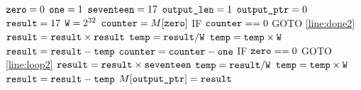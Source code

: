 \documentclass[11pt]{article}
\begin{document}
\begin{enumerate}
\begin{algorithm}[H]
\setcounter{AlgoLine}{-1}
$\texttt{zero} = 0$\;
$\texttt{one} = 1$\;
$\texttt{seventeen} = 17$\;
$\texttt{output\_len} = 1$\;
$\texttt{output\_ptr} = 0$\;
$\texttt{result} = 17$\;
$\texttt{W} = 2^{32}$\;
$\texttt{counter} = M[\texttt{zero}]$\;
\Indp
IF $\texttt{counter} == 0$ GOTO \ref{line:done2}\; \label{line:loop2}
$\texttt{result} = \texttt{result} \times \texttt{result}$\;
$\texttt{temp} = \texttt{result} / \texttt{W}$\;
$\texttt{temp} = \texttt{temp} \times \texttt{W}$\;
$\texttt{result} = \texttt{result} - \texttt{temp}$\;
$\texttt{counter} = \texttt{counter} - \texttt{one}$\;
IF $\texttt{zero} == 0$ GOTO \ref{line:loop2}\;
\Indm
$\texttt{result} = \texttt{result} \times \texttt{seventeen}$\;
\label{line:done2}
$\texttt{temp} = \texttt{result} / \texttt{W}$\;
$\texttt{temp} = \texttt{temp} \times \texttt{W}$\;
$\texttt{result} = \texttt{result} - \texttt{temp}$\;
$M[\texttt{output\_ptr}]=\texttt{result}$\; 
\end{algorithm}



\end{enumerate}
\end{document}
